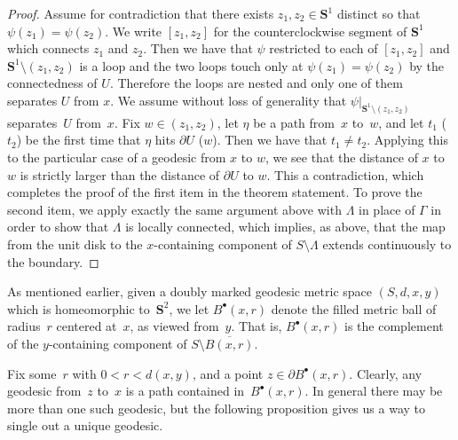 \documentclass[JEP,XML,SOM,Unicode]{cedram}
\newcommand{\sbullet}{{\scriptscriptstyle\bullet}}
\theoremstyle{plain}
\numberwithin{theorem}{section}
\theoremstyle{definition}
\renewcommand{\S}{{\mathbf S}}
\let\ol\overline
\newcommand{\fb}[2]{B^\sbullet(#1,#2)}
\begin{document}
\begin{proof}
Assume for contradiction that there exists $z_1,z_2 \in \S^1$ distinct so that $\psi(z_1) = \psi(z_2)$. We write $[z_1,z_2]$ for the counterclockwise segment of $\S^1$ which connects $z_1$ and $z_2$. Then we have that $\psi$ restricted to each of $[z_1,z_2]$ and $\S^1 \setminus (z_1,z_2)$ is a loop and the two loops touch only at $\psi(z_1) = \psi(z_2)$ by the connectedness of $U$. Therefore the loops are nested and only one of them separates $U$ from $x$. We assume without loss of generality that $\psi|_{\S^1 \setminus (z_1,z_2)}$ separates~$U$ from~$x$. Fix $w \in (z_1,z_2)$, let $\eta$ be a path from~$x$ to~$w$, and let $t_1$ (\resp $t_2$) be the first time that $\eta$ hits $\partial U$ (\resp $w$). Then we have that $t_1 \neq t_2$. Applying this to the particular case of a geodesic from $x$ to $w$, we see that the distance of $x$ to $w$ is strictly larger than the distance of $\partial U$ to $w$. This a contradiction, which completes the proof of the first item in the theorem statement. To prove the second item, we apply exactly the same argument above with $\Lambda$ in place of $\Gamma$ in order to show that $\Lambda$ is locally connected, which implies, as above, that the map from the unit disk to the $x$-containing component of $S \setminus \Lambda$ extends continuously to the boundary.
\end{proof}

As mentioned earlier, given a doubly marked geodesic metric space $(S, d, x, y)$ which is homeomorphic to~$\S^2$, we let $\fb{x}{r}$ denote the filled metric ball of radius~$r$ centered at~$x$, as viewed from~$y$. That is, $\fb{x}{r}$ is the complement of the $y$-containing component of $S \setminus \ol{B(x,r)}$.

Fix some~$r$ with $0 < r < d(x,y)$, and a point $z \in \partial \fb{x}{r}$. Clearly, any geodesic from~$z$ to~$x$ is a path contained in~$\fb{x}{r}$. In general there may be more than one such geodesic, but the following proposition gives us a way to single out a unique geodesic.\vspace*{-5pt}\enlargethispage{\baselineskip}%
\end{document}
